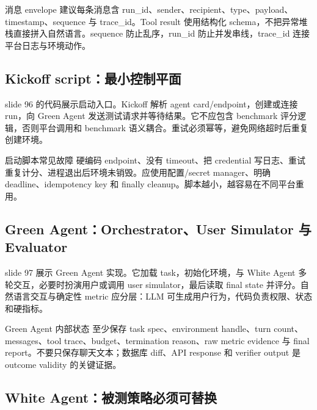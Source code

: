 \begin{knowledgebox}{消息 envelope}
建议每条消息含 run\_id、sender、recipient、type、payload、timestamp、sequence 与 trace\_id。Tool result 使用结构化 schema，不把异常堆栈直接拼入自然语言。sequence 防止乱序，run\_id 防止并发串线，trace\_id 连接平台日志与环境动作。
\end{knowledgebox}

\subsection{Kickoff script：最小控制平面}

slide 96 的代码展示启动入口。Kickoff 解析 agent card/endpoint，创建或连接 run，向 Green Agent 发送测试请求并等待结果。它不应包含 benchmark 评分逻辑，否则平台调用和 benchmark 语义耦合。重试必须幂等，避免网络超时后重复创建环境。


\begin{warningbox}{启动脚本常见故障}
硬编码 endpoint、没有 timeout、把 credential 写日志、重试重复计分、进程退出后环境未销毁。应使用配置/secret manager、明确 deadline、idempotency key 和 finally cleanup。脚本越小，越容易在不同平台重用。
\end{warningbox}

\subsection{Green Agent：Orchestrator、User Simulator 与 Evaluator}

slide 97 展示 Green Agent 实现。它加载 task，初始化环境，与 White Agent 多轮交互，必要时扮演用户或调用 user simulator，最后读取 final state 并评分。自然语言交互与确定性 metric 应分层：LLM 可生成用户行为，代码负责权限、状态和硬指标。


\begin{knowledgebox}{Green Agent 内部状态}
至少保存 task spec、environment handle、turn count、messages、tool trace、budget、termination reason、raw metric evidence 与 final report。不要只保存聊天文本；数据库 diff、API response 和 verifier output 是 outcome validity 的关键证据。
\end{knowledgebox}

\subsection{White Agent：被测策略必须可替换}

